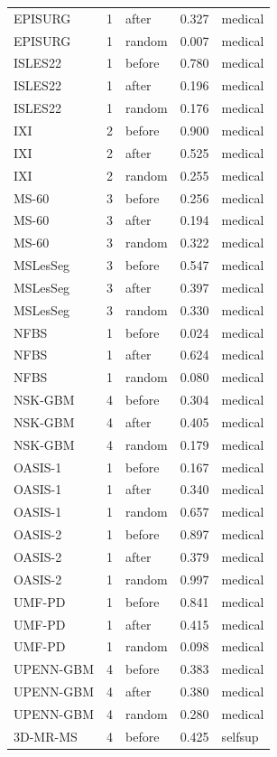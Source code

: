 \begin{tabular}{lrlrl}
EPISURG & 1 & after & 0.327 & medical \\
EPISURG & 1 & random & 0.007 & medical \\
ISLES22 & 1 & before & 0.780 & medical \\
ISLES22 & 1 & after & 0.196 & medical \\
ISLES22 & 1 & random & 0.176 & medical \\
IXI & 2 & before & 0.900 & medical \\
IXI & 2 & after & 0.525 & medical \\
IXI & 2 & random & 0.255 & medical \\
MS-60 & 3 & before & 0.256 & medical \\
MS-60 & 3 & after & 0.194 & medical \\
MS-60 & 3 & random & 0.322 & medical \\
MSLesSeg & 3 & before & 0.547 & medical \\
MSLesSeg & 3 & after & 0.397 & medical \\
MSLesSeg & 3 & random & 0.330 & medical \\
NFBS & 1 & before & 0.024 & medical \\
NFBS & 1 & after & 0.624 & medical \\
NFBS & 1 & random & 0.080 & medical \\
NSK-GBM & 4 & before & 0.304 & medical \\
NSK-GBM & 4 & after & 0.405 & medical \\
NSK-GBM & 4 & random & 0.179 & medical \\
OASIS-1 & 1 & before & 0.167 & medical \\
OASIS-1 & 1 & after & 0.340 & medical \\
OASIS-1 & 1 & random & 0.657 & medical \\
OASIS-2 & 1 & before & 0.897 & medical \\
OASIS-2 & 1 & after & 0.379 & medical \\
OASIS-2 & 1 & random & 0.997 & medical \\
UMF-PD & 1 & before & 0.841 & medical \\
UMF-PD & 1 & after & 0.415 & medical \\
UMF-PD & 1 & random & 0.098 & medical \\
UPENN-GBM & 4 & before & 0.383 & medical \\
UPENN-GBM & 4 & after & 0.380 & medical \\
UPENN-GBM & 4 & random & 0.280 & medical \\
3D-MR-MS & 4 & before & 0.425 & selfsup \\

\end{tabular}
